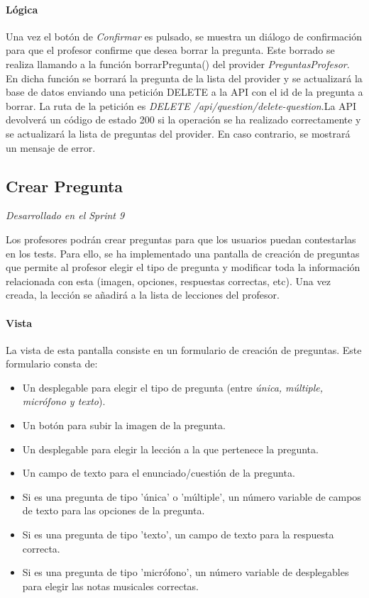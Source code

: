 \paragraph*{Lógica}
Una vez el botón de \textit{Confirmar} es pulsado, se muestra un diálogo de confirmación para que el profesor confirme que desea borrar la pregunta.
Este borrado se realiza llamando a la función borrarPregunta() del provider \textit{PreguntasProfesor}. En dicha función se borrará la pregunta de la lista del provider y se actualizará la base de datos enviando
una petición DELETE a la API con el id de la pregunta a borrar. La ruta de la petición es \textit{DELETE /api/question/delete-question}.La API devolverá un código de estado 200 si la operación se ha realizado correctamente y se actualizará la lista de preguntas del provider. En caso contrario, se mostrará un mensaje de error.


\subsection{Crear Pregunta} 

\textit{Desarrollado en el Sprint 9}

Los profesores podrán crear preguntas para que los usuarios puedan contestarlas en los tests. Para ello, se ha implementado una pantalla de creación de preguntas que permite al profesor elegir el tipo de pregunta y modificar toda la información relacionada con esta (imagen, opciones, respuestas correctas, etc). Una vez creada, la lección se añadirá a la lista de lecciones del profesor.



\paragraph*{Vista}
La vista de esta pantalla consiste en un formulario de creación de preguntas. Este formulario consta de:
\begin{itemize}
  \item Un desplegable para elegir el tipo de pregunta (entre \textit{única, múltiple, micrófono y texto}).
  \item Un botón para subir la imagen de la pregunta.
  \item Un desplegable para elegir la lección a la que pertenece la pregunta.
  \item Un campo de texto para el enunciado/cuestión de la pregunta.
  \item Si es una pregunta de tipo 'única' o 'múltiple', un número variable de campos de texto para las opciones de la pregunta.
  \item Si es una pregunta de tipo 'texto', un campo de texto para la respuesta correcta.
  \item Si es una pregunta de tipo 'micrófono', un número variable de desplegables para elegir las notas musicales correctas.
\end{itemize}


